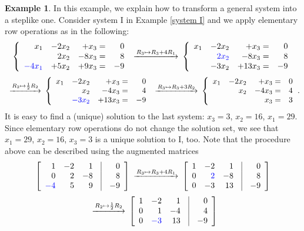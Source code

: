 \documentclass[12pt,letterpaper]{book}
\def\blue{\textcolor{blue}}
\numberwithin{equation}{section}
\theoremstyle{definition}
\newtheorem{example}[thm]{\textbf{Example}}
\begin{document}
\begin{example}\label{fundamental example} In this example, we explain how to transform a general system into a steplike one. Consider system I in Example \ref{system I} and we apply elementary row operations as in the following:
$$\begin{CD}\left\{\begin{array}{rrrr}
x_1&-2x_2&+x_3=&0
\\ &2x_2 &-8x_3=&8 \\ \blue{-4x_1}&+5x_2&+9x_3=&-9 \end{array}\right. @>R_3 \mapsto R_3+4R_1>> \left\{\begin{array}{rrrr}
x_1&-2x_2&+x_3=&0
\\ &\blue{2x_2} &-8x_3=&8 \\ &-3x_2&+13x_3=&-9 \end{array}\right.\end{CD}$$
$$\begin{CD} @>R_2\mapsto \frac{1}{2}R_2>> \left\{\begin{array}{rrrr}
x_1&-2x_2&+x_3=&0
\\ &x_2 &-4x_3=&4 \\ &\blue{-3x_2}&+13x_3=&-9 \end{array}\right. @>R_3\mapsto R_3+3R_2>> \left\{\begin{array}{rrrr}
x_1&-2x_2&+x_3=&0
\\ &x_2 &-4x_3=&4 \\ &&x_3=&3\end{array}\right.\end{CD}.$$
It is easy to find a (unique) solution to the last system:
$x_3=3$, $x_2=16$,
$x_1=29$. Since elementary row operations do not change the solution set, we see that $x_1=29$, $x_2=16$, $x_3=3$ is a unique solution to I, too. Note that the procedure above can be described using the augmented matrices
$$\begin{CD} \left[\begin{array}{rrr@{\quad}|@{\quad}r}1&-2&1& 0\\0&2&-8& 8
\\ \blue{-4}&5&9& -9\end{array}\right] @>R_3 \mapsto R_3+4R_1>> \left[\begin{array}{rrr@{\quad}|@{\quad}r}1&-2&1&0\\0&\blue{2}&-8& 8
\\0&-3&13& -9\end{array}\right] \end{CD}$$
$$\begin{CD} @>R_2\mapsto \frac{1}{2}R_2>> \left[\begin{array}{rrr@{\quad}|@{\quad}r}1&-2&1& 0 \\ 0&1&-4& 4\\ 0& \blue{-3} &13& -9\end{array}\right]

\end{CD}$$
\end{example}
\end{document}
